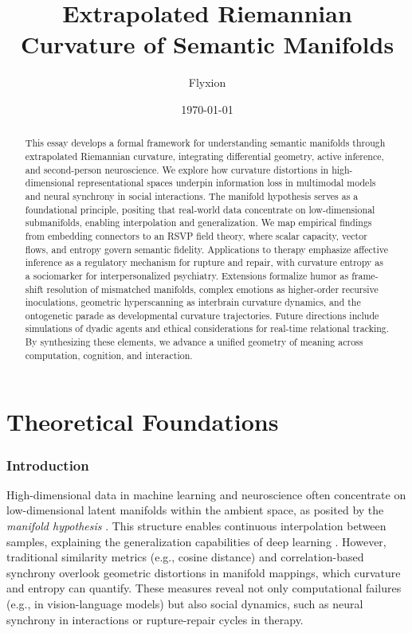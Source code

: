 \documentclass{article}
\title{Extrapolated Riemannian Curvature of Semantic Manifolds}
\author{Flyxion}
\date{\today}
\theoremstyle{definition}
\begin{document}
\maketitle

\begin{abstract}
This essay develops a formal framework for understanding semantic manifolds through extrapolated Riemannian curvature, integrating differential geometry, active inference, and second-person neuroscience. We explore how curvature distortions in high-dimensional representational spaces underpin information loss in multimodal models and neural synchrony in social interactions. The manifold hypothesis serves as a foundational principle, positing that real-world data concentrate on low-dimensional submanifolds, enabling interpolation and generalization. We map empirical findings from embedding connectors to an RSVP field theory, where scalar capacity, vector flows, and entropy govern semantic fidelity. Applications to therapy emphasize affective inference as a regulatory mechanism for rupture and repair, with curvature entropy as a sociomarker for interpersonalized psychiatry. Extensions formalize humor as frame-shift resolution of mismatched manifolds, complex emotions as higher-order recursive inoculations, geometric hyperscanning as interbrain curvature dynamics, and the ontogenetic parade as developmental curvature trajectories. Future directions include simulations of dyadic agents and ethical considerations for real-time relational tracking. By synthesizing these elements, we advance a unified geometry of meaning across computation, cognition, and interaction.
\end{abstract}

\tableofcontents

\part{Theoretical Foundations}

\section{Introduction}
High-dimensional data in machine learning and neuroscience often concentrate on low-dimensional latent manifolds within the ambient space, as posited by the \emph{manifold hypothesis} \cite{fefferman2016testing,gorban2018blessing,olah2014blog,cayton2005algorithms}. This structure enables continuous interpolation between samples, explaining the generalization capabilities of deep learning \cite{chollet2021deep}. However, traditional similarity metrics (e.g., cosine distance) and correlation-based synchrony overlook geometric distortions in manifold mappings, which curvature and entropy can quantify. These measures reveal not only computational failures (e.g., in vision-language models) but also social dynamics, such as neural synchrony in interactions or rupture-repair cycles in therapy.
\end{document}
